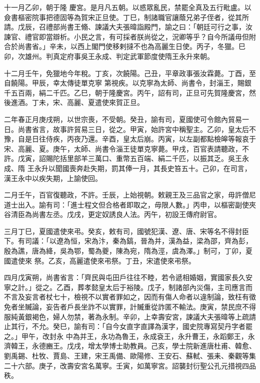 \begin{pinyinscope}
 十一月乙卯，朝于隆
 慶宮。是月凡五朝。以惑眾亂民，禁罷全真及五行毗盧。以僉書樞密院事把德固等為賀宋正旦使。丁巳，制諸職官讓蔭兄弟子侄者，從其所請。戊辰，召禮部尚書王翛、諫議大夫張暐詣殿門，諭之曰：「朝廷可行之事，汝諫官、禮官即當辯析。小民之言，有可採者朕尚從之，況卿等乎？自今所議毋但附合於尚書省。」辛未，以西上閣門使移剌撻不也為高麗生日使。丙子，冬獵。巳卯，次雄州。判真定府事吳王永成、判定武軍節度使隋王永升來朝。



 十二月壬午，免獵地今年稅。丁亥，次饒陽。己丑，平章政事張汝霖薨。丁酉，至自饒陽。甲辰，幸太傳徒單克寧
 第視疾。以克寧為太師、尚書令，封淄王，賜銀千五百兩，絹二千匹。乙巳，朝于隆慶宮。丙午，詔有司，正旦可先賀隆慶宮，然後進酒。丁未，宋、高麗、夏遣使來賀正旦。



 二年春正月庚戌朔，以世宗喪，不受朝。癸丑，諭有司，夏國使可令館內貿易一日。尚書省言，故事許貿易三日，從之。甲寅，始許宮中稱聖主。乙卯，皇太后不豫，自是日往侍疾，丙夜乃還。辛酉，皇太后崩。丙寅，以左副都點檢皞等報哀于宋、高麗、夏。庚午，太師、尚書令淄王徒單克寧薨。甲戌，百官表請聽政，不許。戊寅，詔賜陀括里部羊三萬口、重幣五百端、絹二千匹，以振其乏。吳王永成、隋
 王永升以聞國喪奔赴失期，罰其俸一月，其長史笞五十。己卯，在司言，漢王永中以疾失期，上諭使回。



 二月壬午，百官復聽政，不許。壬辰，上始視朝。敕親王及三品官之家，毋許僧尼道士出入。諭有司：「進士程文但合格者即取之，毋限人數。」丙申，以樞密副使夾谷清臣為尚書左丞。戊戌，更定奴誘良人法。丙午，初設王傳府尉官。



 三月丁巳，夏國遣使來弔。癸亥，敕有司，國號犯漢、遼、唐、宋等名不得封臣下。有司議：「以遼為恒，宋為汴，秦為鎬，晉為并，漢為益，梁為邵，齊為彭，殷為譙，唐為絳，吳為鄂，蜀為夔，陳為宛，隋為涇，虞為澤。」制可，丁卯，夏國遣使來
 祭。乙亥，高麗遣使來弔祭。丁丑，宋遣使來弔祭。



 四月戊寅朔，尚書省言：「齊民與屯田戶往往不睦，若令遞相婚姻，實國家長久安寧之計。」從之。乙酉，葬孝懿皇太后于裕陵。戊子，制諸部內災傷，主司應言而不言及妄言者杖七十，檢視不以實者罪如之，因而有傷人命者以違制論，致枉有徵免者坐贓論，妄告者戶長坐詐不以實罪，計贓重從詐匿不輸法。庚寅，禁民庶不得服純黃銀褐色，婦人勿禁，著為永制。辛卯，上幸壽安宮，諫議大夫張暐等上疏請止其行，不允。癸巳，諭有司：「自今女直字直譯為漢字，國史院專寫契丹字者罷之。」甲午，改封永
 中為并王，永功為魯王，永成袞王，永升曹王，永蹈鄭王，永濟韓王，永德豳王。戊戌，增太學博士助教員。己亥，學士院新進唐杜甫、韓愈、劉禹錫、杜牧、賈島、王建，宋王禹備、歐陽修、王安石、蘇軾、張耒、秦觀等集二十六部。庚子，改壽安宮名萬寧。壬寅，如萬寧宮。詔襲封衍聖公孔元措視四品秩。




\end{pinyinscope}
